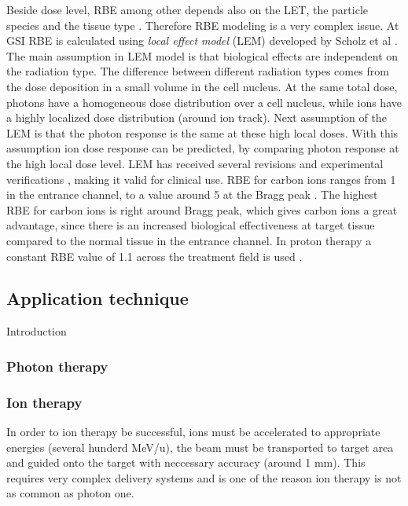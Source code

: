 \documentclass[type=dr, dr=rernat, accentcolor=tud7b,colorbacktitle, bigchapter, openright, twoside, 12pt ]{tudthesis}
\begin{document}
Beside dose level, RBE among other depends also on the LET, the particle species and the tissue type \cite{Kraft2000}. Therefore RBE modeling is a very complex issue.
At GSI RBE is calculated using \textit{local effect model} (LEM) developed by Scholz et al \cite{Scholz1994}. The main assumption in LEM model is that biological 
effects are independent on the radiation type. The difference between different radiation types comes from the dose deposition in a small volume in the cell nucleus.
At the same total dose, photons have a homogeneous dose distribution over a cell nucleus, while ions have a highly localized dose distribution (around ion track).
Next assumption of the LEM is that the photon response is the same at these high local doses. With this assumption ion dose response can be predicted, by comparing
photon response at the high local dose level. LEM has received several revisions \cite{Elsaesser2006, Elsaesser2007, Elsaesser2009} and experimental verifications
\cite{Mitaroff1998, Kraemer2000a, Kraemer2003}, making it valid for clinical use. RBE for carbon ions ranges from 1 in the entrance channel, to a value around 5 at 
the Bragg peak \cite{Kraft2000}. The highest RBE for carbon ions is right around Bragg peak, which gives carbon ions a great advantage, since there is an increased 
biological effectiveness at target tissue compared to the normal tissue in the entrance channel. In proton therapy a constant RBE value of 1.1 across the treatment field
is used \cite{Paganetti2002}.


\subsection{Application technique}

Introduction

\subsubsection{Photon therapy}


\subsubsection{Ion therapy}

In order to ion therapy be successful, ions must be accelerated to appropriate energies (several hunderd MeV/u), the beam must be transported to target area and guided
onto the target with neccessary accuracy (around 1 mm). This requires very complex delivery systems and is one of the reason ion therapy is not as common as photon one.
\end{document}
